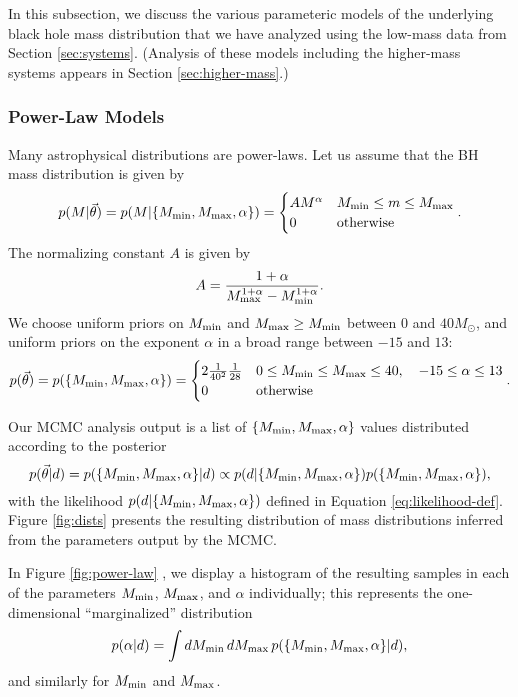 \documentclass[preprint]{aastex}
\newcommand{\Msun}{M_\odot}
\newcommand{\Mmin}{M_{\textnormal{min}}}
\newcommand{\Mmax}{M_{\textnormal{max}}}
\newcommand{\vtheta}{\vec{\theta}}
\begin{document}
In this subsection, we discuss the various parameteric models of the
underlying black hole mass distribution that we have analyzed using
the low-mass data from Section \ref{sec:systems}.  (Analysis of these
models including the higher-mass systems appears in Section
\ref{sec:higher-mass}.)

\subsubsection{Power-Law Models}
\label{subsubsec:power-law}

Many astrophysical distributions are power-laws.  Let us assume that
the BH mass distribution is given by
\begin{equation}
  \label{eq:power-law-dist}
  p(M|\vtheta) = p(M|\{\Mmin, \Mmax, \alpha \}) =
  \begin{cases}
    A M^\alpha & \Mmin \leq m \leq \Mmax \\
    0 & \textnormal{otherwise}
  \end{cases}.
\end{equation}
The normalizing constant $A$ is given by 
\begin{equation}
  A = \frac{1+\alpha}{\Mmax^{1+\alpha} - \Mmin^{1+\alpha}}.
\end{equation}
We choose uniform priors on $\Mmin$ and $\Mmax \geq \Mmin$ between 0 and
$40 \Msun$, and uniform priors on the exponent $\alpha$ in a broad
range between $-15$ and $13$:
\begin{equation}
  p(\vtheta) = p(\{\Mmin, \Mmax, \alpha\}) = 
  \begin{cases}
    2 \frac{1}{40^2}\frac{1}{28} & 0 \leq \Mmin \leq \Mmax
    \leq 40, \quad -15 \leq \alpha \leq 13 \\
    0 & \textnormal{otherwise}
  \end{cases}.
\end{equation}

Our MCMC analysis output is a list of $\{\Mmin, \Mmax, \alpha\}$
values distributed according to the posterior 
\begin{equation}
  p(\vtheta|d) = p(\{\Mmin, \Mmax, \alpha\}|d) \propto p(d|\{\Mmin,
  \Mmax, \alpha\}) p(\{\Mmin, \Mmax, \alpha\}),
\end{equation}
with the likelihood $p(d|\{\Mmin, \Mmax, \alpha\})$ defined in
Equation \eqref{eq:likelihood-def}.  Figure \ref{fig:dists} presents
the resulting distribution of mass distributions inferred from the
parameters output by the MCMC.

In Figure \ref{fig:power-law} , we display a histogram of the resulting
samples in each of the parameters $\Mmin$, $\Mmax$, and $\alpha$
individually; this represents the one-dimensional ``marginalized''
distribution
\begin{equation}
  \label{eq:alpha-pdf}
  p(\alpha|d) = \int d\Mmin\, d\Mmax\, p(\{\Mmin, \Mmax, \alpha\}|d),
\end{equation}
and similarly for $\Mmin$ and $\Mmax$.
\end{document}
